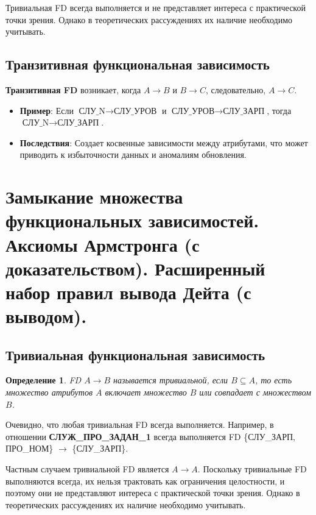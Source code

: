 \documentclass[a4paper,12pt]{article}
\newtheorem{definition}{Определение}
\begin{document}
Тривиальная FD всегда выполняется и не представляет интереса с практической точки зрения. Однако в теоретических рассуждениях их наличие необходимо учитывать.

\subsection{Транзитивная функциональная зависимость}

\textbf{Транзитивная FD} возникает, когда $A \rightarrow B$ и $B \rightarrow C$, следовательно, $A \rightarrow C$.

\begin{itemize}
    \item \textbf{Пример}: Если $\text{СЛУ\_N} \rightarrow \text{СЛУ\_УРОВ}$ и $\text{СЛУ\_УРОВ} \rightarrow \text{СЛУ\_ЗАРП}$, тогда $\text{СЛУ\_N} \rightarrow \text{СЛУ\_ЗАРП}$.


    \item \textbf{Последствия}: Создает косвенные зависимости между атрибутами, что может приводить к избыточности данных и аномалиям обновления.
\end{itemize}

\section{Замыкание множества функциональных зависимостей. Аксиомы Армстронга (с доказательством). Расширенный набор правил вывода Дейта (с выводом).}

\subsection{Тривиальная функциональная зависимость}

\begin{definition}
    FD $A \rightarrow B$ называется тривиальной, если $B \subseteq A$, то есть множество атрибутов $A$ включает множество $B$ или совпадает с множеством $B$.
\end{definition}

Очевидно, что любая тривиальная FD всегда выполняется. Например, в отношении \textbf{СЛУЖ\_ПРО\_ЗАДАН\_1} всегда выполняется FD \{СЛУ\_ЗАРП, ПРО\_НОМ\} $\rightarrow$ \{СЛУ\_ЗАРП\}.

Частным случаем тривиальной FD является $A \rightarrow A$. Поскольку тривиальные FD выполняются всегда, их нельзя трактовать как ограничения целостности, и поэтому они не представляют интереса с практической точки зрения. Однако в теоретических рассуждениях их наличие необходимо учитывать.
\end{document}
